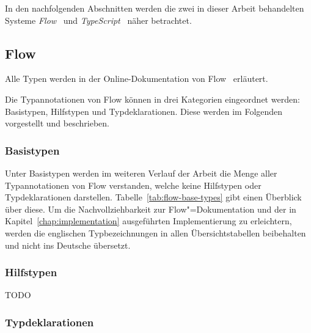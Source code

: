 


In den nachfolgenden Abschnitten werden die zwei in dieser Arbeit behandelten Systeme \textit{Flow}~\autocite{FLOW:PAPER} und \textit{TypeScript}~\autocite{TYPESCRIPT:SPEC} näher betrachtet.

\subsection{Flow}
\label{subsec:flow}

Alle Typen werden in der Online-Dokumentation von Flow~\autocite{FLOW:TYPE_ANNOTATIONS} erläutert.

Die Typannotationen von Flow können in drei Kategorien eingeordnet werden: Basistypen, Hilfstypen und Typdeklarationen. Diese werden im Folgenden vorgestellt und beschrieben.

\subsubsection{Basistypen}
\label{subsec:flow:base-types}

Unter Basistypen werden im weiteren Verlauf der Arbeit die Menge aller Typannotationen von Flow verstanden, welche keine Hilfstypen oder Typdeklarationen darstellen. Tabelle~\ref{tab:flow-base-types} gibt einen Überblick über diese. Um die Nachvollziehbarkeit zur Flow"=Dokumentation und der in Kapitel~\ref{chap:implementation} ausgeführten Implementierung zu erleichtern, werden die englischen Typbezeichnungen in allen Übersichtstabellen beibehalten und nicht ins Deutsche übersetzt.

\bigbreak


\subsubsection{Hilfstypen}
\label{subsec:flow:utility-types}

TODO

\bigbreak


\subsubsection{Typdeklarationen}
\label{subsubsec:type-declarations}

